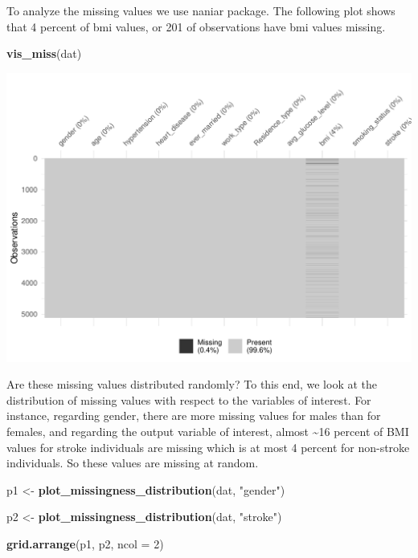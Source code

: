 \documentclass[
]{article}
\newenvironment{Shaded}{\begin{snugshade}}{\end{snugshade}}
\newcommand{\AttributeTok}[1]{\textcolor[rgb]{0.13,0.29,0.53}{#1}}
\newcommand{\DecValTok}[1]{\textcolor[rgb]{0.00,0.00,0.81}{#1}}
\newcommand{\FunctionTok}[1]{\textcolor[rgb]{0.13,0.29,0.53}{\textbf{#1}}}
\newcommand{\NormalTok}[1]{#1}
\newcommand{\OtherTok}[1]{\textcolor[rgb]{0.56,0.35,0.01}{#1}}
\newcommand{\StringTok}[1]{\textcolor[rgb]{0.31,0.60,0.02}{#1}}
\begin{document}
To analyze the missing values we use naniar package. The following plot
shows that 4 percent of bmi values, or 201 of observations have bmi
values missing.

\begin{Shaded}
\begin{Highlighting}[]
\FunctionTok{vis\_miss}\NormalTok{(dat)}
\end{Highlighting}
\end{Shaded}

\includegraphics{Build-deploy-stroke-prediction-model-R_files/figure-latex/miss-plot-1.pdf}

Are these missing values distributed randomly? To this end, we look at
the distribution of missing values with respect to the variables of
interest. For instance, regarding gender, there are more missing values
for males than for females, and regarding the output variable of
interest, almost \textasciitilde16 percent of BMI values for stroke
individuals are missing which is at most 4 percent for non-stroke
individuals. So these values are missing at random.

\begin{Shaded}
\begin{Highlighting}[]
\NormalTok{p1 }\OtherTok{\textless{}{-}} \FunctionTok{plot\_missingness\_distribution}\NormalTok{(dat, }\StringTok{"gender"}\NormalTok{)}

\NormalTok{p2 }\OtherTok{\textless{}{-}} \FunctionTok{plot\_missingness\_distribution}\NormalTok{(dat, }\StringTok{"stroke"}\NormalTok{)}

\FunctionTok{grid.arrange}\NormalTok{(p1, p2, }\AttributeTok{ncol =} \DecValTok{2}\NormalTok{)}
\end{Highlighting}
\end{Shaded}
\end{document}
